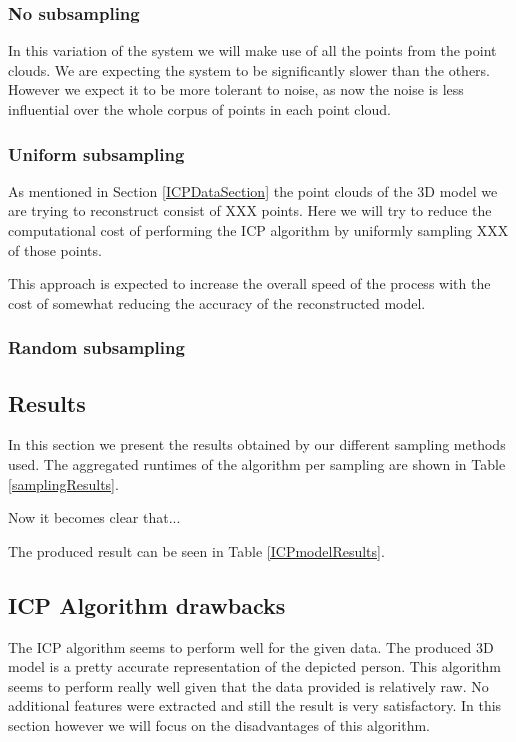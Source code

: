 \documentclass[11pt]{article}
\begin{document}
\subsubsection{No subsampling}
In this variation of the system we will make use of all the points from the point clouds. We are expecting the system to be significantly slower than the others. However we expect it to be more tolerant to noise, as now the noise is less influential over the whole corpus of points in each point cloud.

\subsubsection{Uniform subsampling}
As mentioned in Section \ref{ICPDataSection} the point clouds of the 3D model we are trying to reconstruct consist of XXX points. Here we will try to reduce the computational cost of performing the ICP algorithm by uniformly sampling XXX of those points. 

This approach is expected to increase the overall speed of the process with the cost of somewhat reducing the accuracy of the reconstructed model. 

\subsubsection{Random subsampling}

\subsection{Results}
In this section we present the results obtained by our different sampling methods used. The aggregated runtimes of the algorithm per sampling are shown in Table \ref{samplingResults}.


Now it becomes clear that...

The produced result can be seen in Table \ref{ICPmodelResults}. 

\subsection{ICP Algorithm drawbacks}
The ICP algorithm seems to perform well for the given data. The produced 3D model is a pretty accurate representation of the depicted person. This algorithm seems to perform really well given that the data provided is relatively raw. No additional features were extracted and still the result is very satisfactory. In this section however we will focus on the disadvantages of this algorithm.
\end{document}
